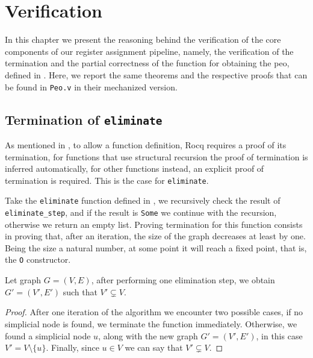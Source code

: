 
\chapter{Verification}
\label{cha:verification}

In this chapter we present the reasoning behind the verification of the core components of our register assignment pipeline, namely, the verification of the termination and the partial correctness of the function for obtaining the \gls{peo}, defined in . Here, we report the same theorems and the respective proofs that can be found in \texttt{Peo.v} in their mechanized version.

\section{Termination of \texttt{eliminate}}

As mentioned in , to allow a function definition, Rocq requires a proof of its termination, for functions that use structural recursion the proof of termination is inferred automatically, for other functions instead, an explicit proof of termination is required. This is the case for \texttt{eliminate}.

Take the \texttt{eliminate} function defined in , we recursively check the result of \texttt{eliminate\_step}, and if the result is \texttt{Some} we continue with the recursion, otherwise we return an empty list. Proving termination for this function consists in proving that, after an iteration, the size of the graph decreases at least by one. Being the size a natural number, at some point it will reach a fixed point, that is, the \texttt{O} constructor.

\begin{theorem}
    Let graph $G = (V, E)$, after performing one elimination step, we obtain $G' = (V', E')$ such that $V' \subsetneq V$.
\end{theorem}
\begin{proof}
    After one iteration of the algorithm we encounter two possible cases, if no simplicial node is found, we terminate the function immediately. Otherwise, we found a simplicial node $u$, along with the new graph $G' = (V', E')$, in this case $V' = V \setminus \{ u \}$. Finally, since $u \in V$ we can say that $V' \subsetneq V$.
\end{proof}


